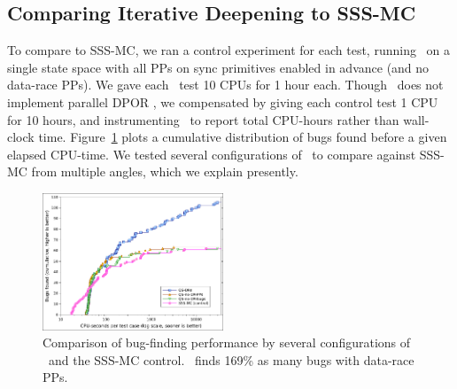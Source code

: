 
\subsection{Comparing Iterative Deepening to SSS-MC}
\label{sec:eval-sssmc}




To compare to SSS-MC, we ran a control experiment for each test, running \landslide~on a single state space with all PPs on sync primitives enabled in advance (and no data-race PPs).
We gave each \quicksand~test 10 CPUs for 1 hour each. %
Though \landslide~does not implement parallel DPOR \cite{parallel-dpor}, we compensated by giving each control test 1 CPU for 10 hours,
and instrumenting \quicksand~to report total CPU-hours rather than wall-clock time.
Figure~\ref{fig:dowefindbugsfaster} plots a cumulative distribution of bugs found before a given elapsed CPU-time. %
We tested several configurations of \quicksand~to compare against SSS-MC from multiple angles,
which we explain presently.

\begin{figure}[t]
	\includegraphics[width=0.48\textwidth]{dowefindbugsfaster.pdf}
	\caption{Comparison of bug-finding performance
	by several configurations of \quicksand~and the SSS-MC control.
	\quicksand~finds 169\% as many bugs with data-race PPs.}
	\label{fig:dowefindbugsfaster}
\end{figure}

